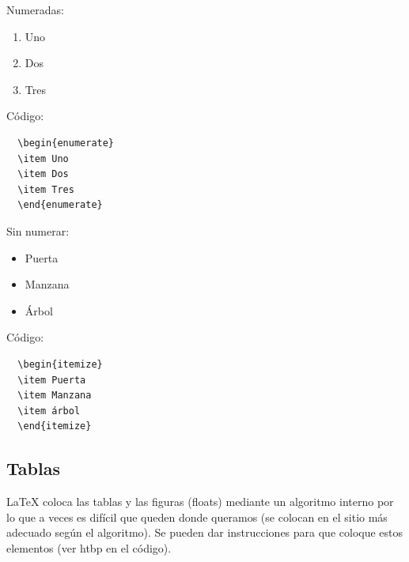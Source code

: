 \vspace{0.25 cm}

Numeradas:
\begin{enumerate}
	\item Uno
	\item Dos
	\item Tres
\end{enumerate}

Código:

\vspace{0.25 cm}

\begin{minipage}{8cm}
\begin{verbatim}
  \begin{enumerate} 
  \item Uno
  \item Dos 
  \item Tres
  \end{enumerate} 
\end{verbatim}
\end{minipage}

\vspace{0.5 cm}

Sin numerar:
\begin{itemize}
	\item Puerta
	\item Manzana
	\item Árbol
\end{itemize}

Código:
\vspace{0.5 cm}

\begin{minipage}{8cm}
\begin{verbatim}
  \begin{itemize}
  \item Puerta
  \item Manzana
  \item árbol
  \end{itemize}
\end{verbatim}
\end{minipage}

\subsection{Tablas}
\label{subsecc:tablas}

\LaTeX{} coloca las tablas y las figuras (floats) mediante un algoritmo interno por lo que a veces es difícil que queden donde queramos (se colocan en el sitio más adecuado según el algoritmo). Se pueden dar instrucciones para que coloque estos elementos (ver htbp en el código). 



